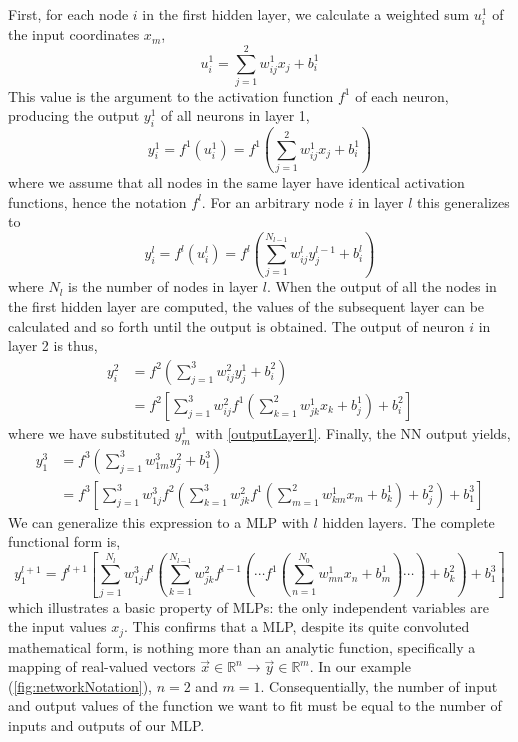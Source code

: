\documentclass[twoside,english]{uiofysmaster}
\begin{document}
First, for each node $i$ in the first hidden layer, we calculate a weighted sum $u_i^1$ of the input coordinates $x_m$,
\begin{equation}
 u_i^1 = \sum_{j=1}^2 w_{ij}^1 x_j  + b_i^1 
\end{equation}
This value is the argument to the activation function $f^1$ of each neuron,
producing the output $y_i^1$ of all neurons in layer 1,
\begin{equation}
 y_i^1 = f^1(u_i^1) = f^1\left(\sum_{j=1}^2 w_{ij}^1 x_j  + b_i^1\right)
 \label{outputLayer1}
\end{equation}
where we assume that all nodes in the same layer have identical activation functions, hence the notation $f^l$. 
For an arbitrary node $i$ in layer $l$ this generalizes to
\begin{equation}
 y_i^l = f^l(u_i^l) = f^l\left(\sum_{j=1}^{N_{l-1}} w_{ij}^l y_j^{l-1} + b_i^l\right)
 \label{generalLayer}
\end{equation}
where $N_l$ is the number of nodes in layer $l$. When the output of all the nodes in the first hidden layer are computed,
the values of the subsequent layer can be calculated and so forth until the output is obtained. 
The output of neuron $i$ in layer 2 is thus,
\begin{align}
 y_i^2 &= f^2\left(\sum_{j=1}^3 w_{ij}^2 y_j^1 + b_i^2\right) \\
 &= f^2\left[\sum_{j=1}^3 w_{ij}^2f^1\left(\sum_{k=1}^2 w_{jk}^1 x_k + b_j^1\right) + b_i^2\right]
 \label{outputLayer2}
\end{align}
where we have substituted $y_m^1$ with \eqref{outputLayer1}. Finally, the NN output yields,
\begin{align}
 y_1^3 &= f^3\left(\sum_{j=1}^3 w_{1m}^3 y_j^2 + b_1^3\right) \\
 &= f^3\left[\sum_{j=1}^3 w_{1j}^3 f^2\left(\sum_{k=1}^3 w_{jk}^2 f^1\left(\sum_{m=1}^2 w_{km}^1 x_m + b_k^1\right) + b_j^2\right)
  + b_1^3\right]
\end{align}
We can generalize this expression to a MLP with $l$ hidden layers. The complete functional form
is,
\begin{equation}
 y^{l+1}_1 = f^{l+1}\left[\sum_{j=1}^{N_l} w_{1j}^3 f^l\left(\sum_{k=1}^{N_{l-1}} w_{jk}^2 f^{l-1}\left(
 \cdots f^1\left(\sum_{n=1}^{N_0} w_{mn}^1 x_n + b_m^1\right)
 \cdots \right) + b_k^2\right)
 + b_1^3\right]
 \label{completeNN}
\end{equation}
which illustrates a basic property of MLPs: the only independent variables are the input values $x_j$. 
This confirms that a MLP,
despite its quite convoluted mathematical form, is nothing more than an analytic function, specifically a 
mapping of real-valued vectors $\vec{x} \in \mathbb{R}^n \rightarrow \vec{y} \in \mathbb{R}^m$. 
In our example (\autoref{fig:networkNotation}), $n=2$ and $m=1$. Consequentially, 
the number of input and output values of the function we want to fit must be equal to the number of inputs and outputs of our MLP.  
\end{document}
